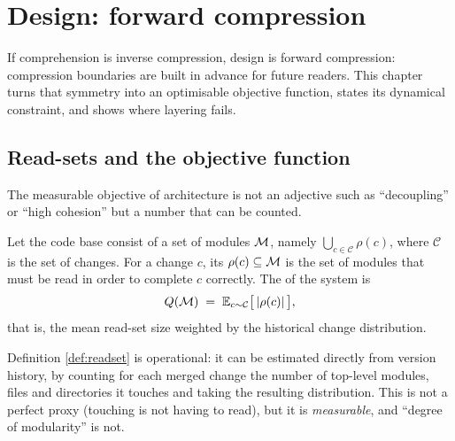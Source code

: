 \chapter{Design: forward compression}\label{ch:design}

If comprehension is inverse compression, design is forward compression: compression
boundaries are built in advance for future readers. This chapter turns that symmetry into
an optimisable objective function, states its dynamical constraint, and shows where
layering fails.

\section{Read-sets and the objective function}\label{sec:readset}

The measurable objective of architecture is not an adjective such as ``decoupling'' or
``high cohesion'' but a number that can be counted.

\begin{definition}\label{def:readset}
Let the code base consist of a set of modules $\mathcal{M}$, namely
$\bigcup_{c \in \mathcal{C}} \rho(c)$, where $\mathcal{C}$ is the set of changes. For a
change $c$, its  $\rho(c) \subseteq \mathcal{M}$ is the set of modules that must be
read in order to complete $c$ correctly. The  of the
system is
\begin{equation}\label{eq:readset}
Q(\mathcal{M}) \;=\; \mathbb{E}_{c \sim \mathcal{C}}\bigl[\,|\rho(c)|\,\bigr],
\end{equation}
that is, the mean read-set size weighted by the historical change distribution.
\end{definition}

Definition \ref{def:readset} is operational: it can be estimated directly from version
history, by counting for each merged change the number of top-level modules, files and
directories it touches and taking the resulting distribution. This is not a perfect proxy
(touching is not having to read), but it is \emph{measurable}, and ``degree of
modularity'' is not.

